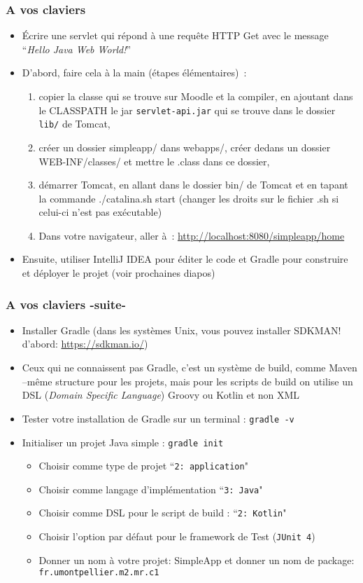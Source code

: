 \documentclass{beamer}
\begin{document}
\begin{frame}
  \frametitle{A vos claviers}

  \begin{itemize}
  \item Écrire une servlet qui répond à une requête HTTP Get avec le
    message ``\textit{Hello Java Web World!}''
    \item D'abord, faire cela à la main (étapes élémentaires)~:
    \begin{enumerate} 
    	\item copier la classe qui se trouve sur Moodle et la compiler, en ajoutant dans le CLASSPATH le jar \texttt{servlet-api.jar} qui se trouve dans le dossier \texttt{lib/} de Tomcat,
    	\item  créer un dossier simpleapp/ dans webapps/, créer dedans un dossier WEB-INF/classes/ et mettre le .class dans ce dossier, 
    	\item démarrer Tomcat, en allant dans le dossier bin/ de Tomcat et en tapant la commande ./catalina.sh start (changer les droits sur le fichier .sh si celui-ci n'est pas exécutable)
    	\item Dans votre navigateur, aller à~: \url{http://localhost:8080/simpleapp/home}
    \end{enumerate}
  \item Ensuite, utiliser IntelliJ IDEA pour éditer le code et Gradle pour construire et déployer le projet (voir prochaines diapos)
  \end{itemize}
\end{frame}

\begin{frame}
	\frametitle{A vos claviers -suite-}
	
	\begin{itemize}
		\item Installer Gradle (dans les systèmes Unix, vous pouvez installer SDKMAN! d'abord: \url{https://sdkman.io/})
		\item Ceux qui ne connaissent pas Gradle, c'est un système de build, comme Maven --même structure pour les projets, mais pour les scripts de build on utilise un DSL (\textit{Domain Specific Language}) Groovy ou Kotlin et non XML
		\item Tester votre installation de Gradle sur un terminal : \texttt{gradle -v}
		\item Initialiser un projet Java simple : \texttt{gradle init}
		\begin{itemize}
			\item Choisir comme type de projet  ``\texttt{2: application}"
			\item Choisir comme langage d'implémentation ``\texttt{3: Java}"
			\item Choisir comme DSL pour le script de build : ``\texttt{2: Kotlin}"
			\item Choisir l'option par défaut pour le framework de Test (\texttt{JUnit 4})
			\item Donner un nom à votre projet: SimpleApp et donner un nom de package: \texttt{fr.umontpellier.m2.mr.c1}
		\end{itemize} 
\end{itemize}
\end{frame}
\end{document}
